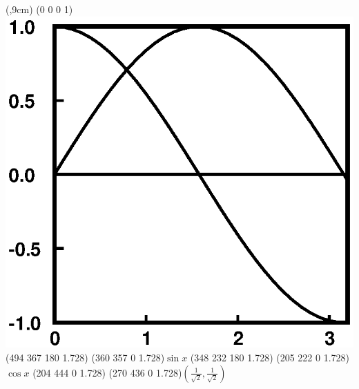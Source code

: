 \documentclass{article}
\begin{document}
\begin{iteblock}(\textwidth,9cm)
\ITE(0 0 0 1)\includegraphics{sc.eps}
\ITE(494 367 180 1.728)
\ITE(360 357 0 1.728)$\sin x$
\ITE(348 232 180 1.728)
\ITE(205 222 0 1.728)$\cos x$
\ITE(204 444 0 1.728)
\ITE(270 436 0 1.728)$(\frac1{\sqrt2},\frac1{\sqrt2})$
\end{iteblock}
\end{document}
